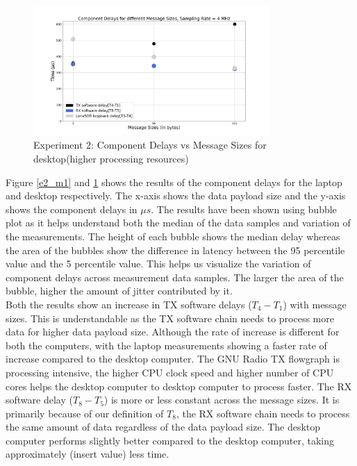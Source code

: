 \begin{figure}[h!]
\centering
\includegraphics[width=0.8\textwidth]{Thesis/Figure/E2_M2_1.png}
\caption{Experiment 2: Component Delays vs Message Sizes for desktop(higher processing resources)}
\label{e2_m2}
\end{figure}


Figure \ref{e2_m1} and \ref{e2_m2} shows the results of the component delays  for the laptop and desktop respectively.
The x-axis shows the data payload size and the y-axis shows the component delays in $\mu s$.
The results have been shown using bubble plot as it helps understand both the median of the data samples and variation of the measurements.
The height of each bubble shows the median delay whereas the area of the bubbles show the difference in latency between the 95 percentile value and the 5 percentile value.
This helps us visualize the variation of component delays across measurement data samples.
The larger the area of the bubble, higher the amount of jitter contributed by it.\\

Both the results show an increase in TX software delays ($T_4 - T_1$) with message sizes.
This is understandable as the TX software chain needs to process more data for higher data payload size.
Although the rate of increase is different for both the computers, with the laptop measurements showing a faster rate of increase compared to the desktop computer.
The GNU Radio TX flowgraph is processing intensive, the higher CPU clock speed and higher number of CPU cores helps the desktop computer to desktop computer to process faster.
The RX software delay ($T_8 - T_5$) is more or less constant across the message sizes.
It is primarily because of our definition of $T_8$, the RX software chain needs to process the same amount of data regardless of the data payload size.
The desktop computer performs slightly better compared to the desktop computer, taking approximately (insert value) less time.\\

